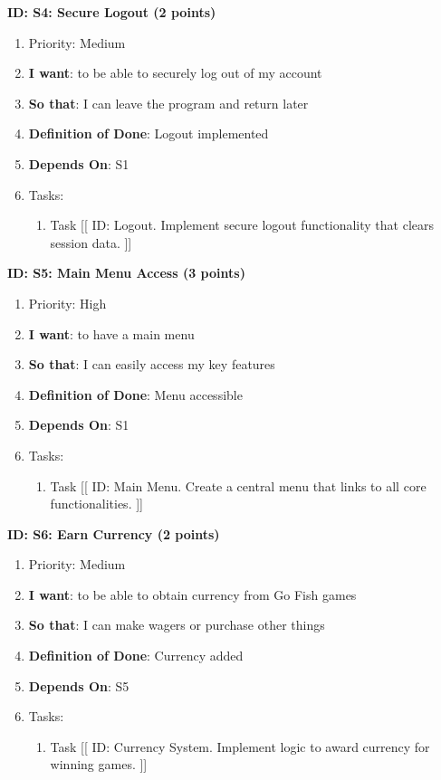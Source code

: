 \textbf{ID: S4: Secure Logout (2 points)}
\begin{enumerate}
    \item Priority: Medium
    \item \textbf{I want}: to be able to securely log out of my account
    \item \textbf{So that}: I can leave the program and return later
    \item \textbf{Definition of Done}: Logout implemented
    \item \textbf{Depends On}: S1
    \item Tasks:
    \begin{enumerate}
        \item Task [[ ID: Logout. Implement secure logout functionality that clears session data. ]]
    \end{enumerate}
\end{enumerate}

\textbf{ID: S5: Main Menu Access (3 points)}
\begin{enumerate}
    \item Priority: High
    \item \textbf{I want}: to have a main menu
    \item \textbf{So that}: I can easily access my key features
    \item \textbf{Definition of Done}: Menu accessible
    \item \textbf{Depends On}: S1
    \item Tasks:
    \begin{enumerate}
        \item Task [[ ID: Main Menu. Create a central menu that links to all core functionalities. ]]
    \end{enumerate}
\end{enumerate}

\textbf{ID: S6: Earn Currency (2 points)}
\begin{enumerate}
    \item Priority: Medium
    \item \textbf{I want}: to be able to obtain currency from Go Fish games
    \item \textbf{So that}: I can make wagers or purchase other things
    \item \textbf{Definition of Done}: Currency added
    \item \textbf{Depends On}: S5
    \item Tasks:
    \begin{enumerate}
        \item Task [[ ID: Currency System. Implement logic to award currency for winning games. ]]
    \end{enumerate}
\end{enumerate}

